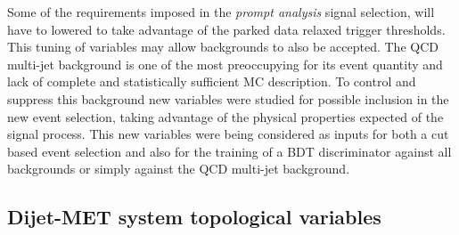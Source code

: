 
Some of the requirements imposed in the \textit{prompt analysis} signal selection, will have to lowered to take advantage of the parked data relaxed trigger thresholds. This tuning of variables may allow backgrounds to also be accepted. The \gls{QCD} multi-jet background is one of the most preoccupying for its event quantity and lack of complete and statistically sufficient \gls{MC} description. To control and suppress this  background new variables were studied for possible inclusion in the new event selection, taking advantage of the physical properties expected of the signal process. This new variables were being considered as inputs for both a cut based event selection and also for the training of a \gls{BDT} discriminator against all backgrounds or simply against the \gls{QCD} multi-jet background.

\subsection{Dijet-MET system topological variables}
\label{SECTION:PreparationParkedDataAnalysis_DijetMETSystemVars}
% 
% 
% 
% 
%
%


